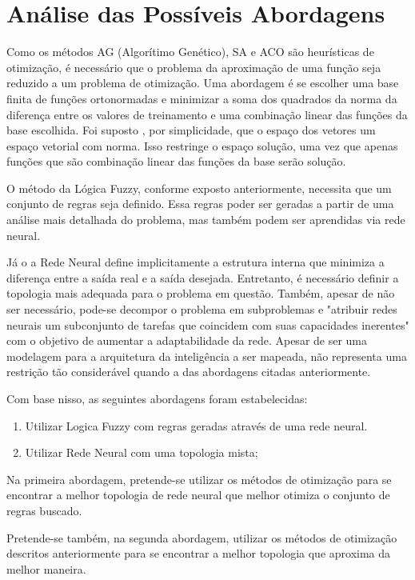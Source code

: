 \chapter{Análise das Possíveis Abordagens}

Como os métodos AG (Algorítimo Genético),
SA e ACO são heurísticas de otimização, é necessário que o problema da aproximação
de uma função seja reduzido a um problema de otimização. Uma abordagem é se escolher uma
base finita de funções ortonormadas e minimizar a soma dos quadrados da norma da diferença
entre os valores de treinamento e uma combinação linear das funções da base escolhida. Foi suposto
, por simplicidade, que o espaço dos vetores um espaço vetorial com norma. Isso restringe o
espaço solução, uma vez que apenas funções que são combinação linear das funções da base serão solução.

O método da Lógica Fuzzy, conforme exposto anteriormente, necessita que um conjunto de regras seja definido.
Essa regras poder ser geradas a partir de uma análise mais detalhada do problema, mas também podem ser 
aprendidas via rede neural.

Já o a Rede Neural define implicitamente a estrutura interna
que minimiza a diferença entre a saída real e a saída desejada.
Entretanto, é necessário definir a topologia mais adequada para o
problema em questão. Também, apesar de não ser necessário, pode-se
decompor o problema em subproblemas e "atribuir redes neurais um
subconjunto de tarefas que coincidem com suas capacidades
inerentes" \cite[pag. 29]{haykin2001redes} com o objetivo de aumentar a
adaptabilidade da rede. Apesar de ser uma modelagem para a arquitetura
da inteligência a ser mapeada, não representa uma restrição tão
considerável quando a das abordagens citadas anteriormente.

Com base nisso, as seguintes abordagens foram estabelecidas:

\begin{enumerate}
 \item Utilizar Logica Fuzzy com regras geradas através de uma rede neural.
 \item Utilizar Rede Neural com uma topologia mista;
\end{enumerate}

Na primeira abordagem, pretende-se utilizar os métodos de otimização para se
encontrar a melhor topologia de rede neural que melhor otimiza o conjunto de
regras buscado.

Pretende-se também, na segunda abordagem, utilizar os métodos de otimização
descritos anteriormente para se encontrar a melhor topologia que aproxima da
melhor maneira.
